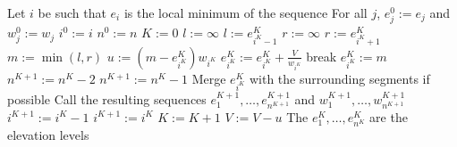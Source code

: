\documentclass[11pt,a4paper]{article}
\begin{document}
\begin{algorithmic}[1]
    \State Let $i$ be such that $e_i$ is the local minimum of the sequence\; \label{a1:minimum}
    \State For all $j$, $e_j^0 := e_j$ and $w_j^0 := w_j$
    \State $i^0 := i$
    \State $n^0 := n$
    \State $K := 0$
     \label{a1:while}
        \State $l := \infty$
            \State $l := e_{i^K-1}^K$
        \EndIf
        \State $r := \infty$
            \State $r := e_{i^K+1}^K$
        \EndIf
        \State $m := \min(l, r)$
        \State $u := (m-e_{i^K}^K)w_{i^K}$
         \label{a1:vleu}
            \State $e_{i^K}^K := e_{i^K}^K + \frac{V}{w_{i^K}}$ \label{a1:vplus}
            \State break \label{a1:break}
        \EndIf
        \State $e_{i^K}^K := m$ \label{a1:newe}
         \label{a1:leqr}
            \State $n^{K+1} := n^K - 2$ \label{a1:min2}
        \Else
            \State $n^{K+1} := n^K - 1$ \label{a1:min1}
        \EndIf
        \State Merge $e_{i^K}^K$ with the surrounding segments if possible \label{a1:merge}
        \State Call the resulting sequences $e_1^{K+1},\ldots,e_{n^{K+1}}^{K+1}$ and $w_1^{K+1},\ldots,w_{n^{K+1}}^{K+1}$
         \label{a1:ller}
            \State $i^{K+1} := i^K - 1$ \label{a1:imin1}
        \Else
            \State $i^{K+1} := i^K$ \label{a1:imin0}
        \EndIf
        \State $K := K + 1$
        \State $V := V - u$
    \EndWhile
    \State The $e_1^K,\ldots,e_{n^K}^K$ are the elevation levels
\end{algorithmic}
\end{document}
